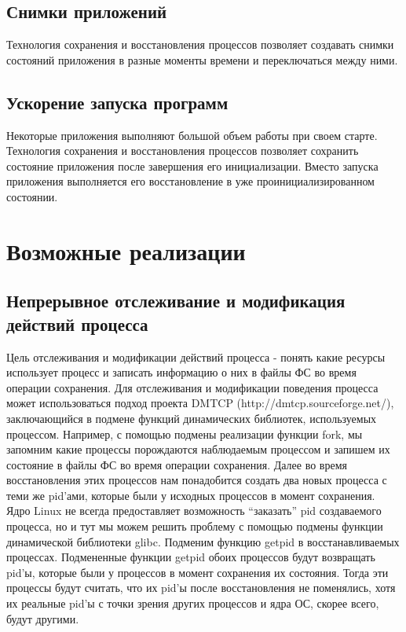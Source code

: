 \subsection{Снимки приложений}
 
Технология сохранения и восстановления процессов позволяет создавать снимки состояний приложения в разные моменты времени и переключаться между ними. 
 
\subsection{Ускорение запуска программ}
 
Некоторые приложения выполняют большой объем работы при своем старте. Технология сохранения и восстановления процессов позволяет сохранить состояние приложения после завершения его инициализации. Вместо запуска приложения выполняется его восстановление в уже проинициализированном состоянии.
 

\section{Возможные реализации}

\subsection{Непрерывное отслеживание и модификация действий процесса}
 
Цель отслеживания и модификации действий процесса - понять какие ресурсы использует процесс и записать информацию о них в файлы ФС во время операции сохранения. Для отслеживания и модификации поведения процесса может использоваться подход проекта DMTCP (http://dmtcp.sourceforge.net/), заключающийся в подмене функций динамических библиотек, используемых процессом. Например, с помощью подмены реализации функции fork, мы запомним какие процессы порождаются наблюдаемым процессом и запишем их состояние в файлы ФС во время операции сохранения. Далее во время восстановления этих процессов нам понадобится создать два новых процесса с теми же pid’ами, которые были у исходных процессов в момент сохранения. Ядро Linux не всегда предоставляет возможность “заказать” pid создаваемого процесса, но и тут мы можем решить проблему с помощью подмены функции динамической библиотеки glibc. Подменим функцию getpid в восстанавливаемых процессах. Подмененные функции getpid обоих процессов будут возвращать pid’ы, которые были у процессов в момент сохранения их состояния. Тогда эти процессы будут считать, что их pid’ы после восстановления не поменялись, хотя их реальные pid’ы с точки зрения других процессов и ядра ОС, скорее всего, будут другими.
 
